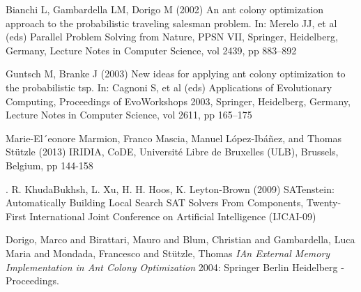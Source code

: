 \documentclass[12pt]{article}
\begin{document}
\begin{thebibliography}{1}
 Bianchi L, Gambardella LM, Dorigo M (2002) An ant colony optimization approach to the probabilistic traveling salesman problem. In: Merelo JJ, et al (eds) Parallel Problem Solving from Nature, PPSN VII, Springer, Heidelberg, Germany, Lecture Notes in Computer Science, vol 2439, pp 883–892

 Guntsch M, Branke J (2003) New ideas for applying ant colony optimization to the probabilistic tsp. In: Cagnoni S, et al (eds) Applications of Evolutionary Computing, Proceedings of EvoWorkshops 2003, Springer, Heidelberg, Germany, Lecture Notes in Computer Science, vol 2611, pp 165–175

 Marie-El´eonore Marmion, Franco Mascia,
Manuel L{\'o}pez-Ib{\'a}{\~n}ez, and Thomas St{\"u}tzle (2013) IRIDIA, CoDE, Universit{\'e} Libre de Bruxelles (ULB), Brussels, Belgium, pp 144-158

 . R. KhudaBukhsh, L. Xu, H. H. Hoos, K. Leyton-Brown (2009) SATenstein: Automatically Building Local Search SAT Solvers From Components, Twenty-First International Joint Conference on Artificial Intelligence (IJCAI-09)

 
 Dorigo, Marco
and Birattari, Mauro
and Blum, Christian
and Gambardella, Luca Maria
and Mondada, Francesco
and St{\"u}tzle, Thomas {\em IAn External Memory Implementation in Ant Colony Optimization} 2004: Springer Berlin Heidelberg - Proceedings.

\end{thebibliography}

 
\end{document}
